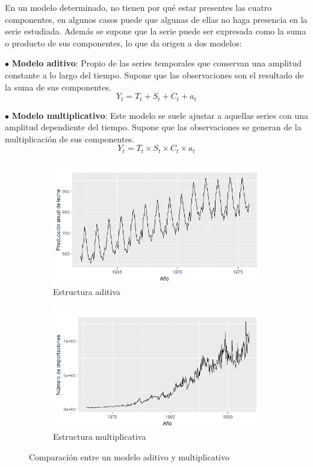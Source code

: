 En un modelo determinado, no tienen por qué estar presentes las cuatro componentes, en algunos casos puede que algunas de ellas no haga presencia en la serie estudiada. Además se supone que la serie puede ser expresada como la suma o producto de sus componentes, lo que da origen a dos modelos:

\begin{itemize*}
  \item[$\bullet$] \textbf{Modelo aditivo}: Propio de las series temporales que conservan una amplitud constante a lo largo del tiempo. Supone que las observaciones son el resultado de la suma de sus componentes.
      \begin{equation}
        Y_t = T_t + S_t + C_t + a_t
      \end{equation}
  \item[$\bullet$] \textbf{Modelo multiplicativo}: Este modelo se suele ajustar a aquellas series con una amplitud dependiente del tiempo. Supone que las observaciones se generan de la multiplicación de sus componentes.
      \begin{equation}
        Y_t = T_t \times S_t \times C_t \times a_t
      \end{equation}
\end{itemize*}

\begin{figure}
\begin{subfigure}{.5\textwidth}
  \centering
  \includegraphics[width=.8\linewidth]{Images/Conceptos/leche.png}
  \caption{Estructura aditiva}
  \label{fig:sfig1}
\end{subfigure}
\begin{subfigure}{.5\textwidth}
  \centering
  \includegraphics[width=.8\linewidth]{Images/Conceptos/importaciones.png}
  \caption{Estructura multiplicativa}
  \label{fig:sfig2}
\end{subfigure}
\caption{Comparación entre un modelo aditivo y multiplicativo}
\label{ad_mult}
\end{figure}

